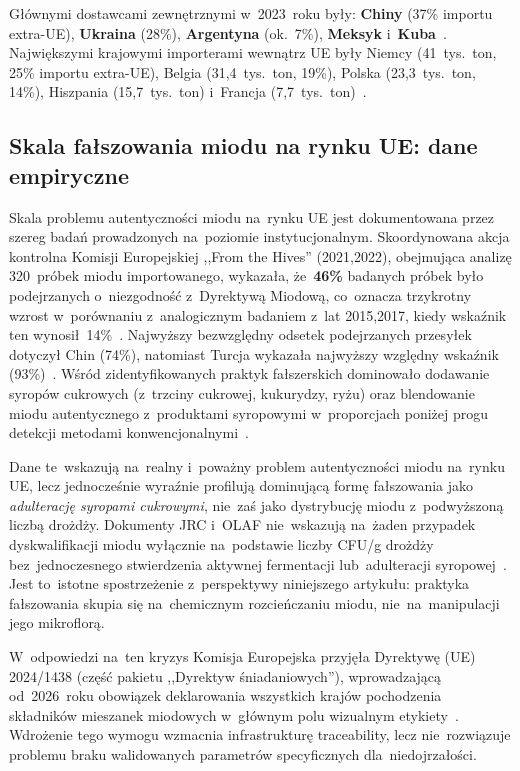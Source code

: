 Głównymi dostawcami zewnętrznymi w~2023~roku były:
\textbf{Chiny} (37\% importu extra-UE), \textbf{Ukraina} (28\%),
\textbf{Argentyna} (ok.~7\%), \textbf{Meksyk} i~\textbf{Kuba}~\cite{tridge2024}.
Największymi krajowymi importerami wewnątrz UE były Niemcy
(41~tys.~ton, 25\% importu extra-UE), Belgia (31,4~tys.~ton,
19\%), Polska (23,3~tys.~ton, 14\%), Hiszpania (15,7~tys.~ton)
i~Francja (7,7~tys.~ton)~\cite{eurostat_honey2023}. 

\subsection{Skala fałszowania miodu na rynku UE: dane empiryczne}

Skala problemu autentyczności miodu na~rynku UE jest
dokumentowana przez szereg badań prowadzonych na~poziomie
instytucjonalnym. Skoordynowana akcja kontrolna Komisji
Europejskiej ,,From the Hives'' (2021,2022), obejmująca
analizę 320~próbek miodu importowanego, wykazała, że~\textbf{46\%}
badanych próbek było podejrzanych o~niezgodność z~Dyrektywą
Miodową, co~oznacza trzykrotny wzrost w~porównaniu z~analogicznym
badaniem z~lat 2015,2017, kiedy wskaźnik ten wynosił~14\%~\cite{eufromhives2021}.
Najwyższy bezwzględny odsetek podejrzanych przesyłek
dotyczył Chin (74\%), natomiast Turcja wykazała najwyższy
względny wskaźnik (93\%)~\cite{eufromhives2021}. Wśród
zidentyfikowanych praktyk fałszerskich dominowało dodawanie
syropów cukrowych (z~trzciny cukrowej, kukurydzy, ryżu)
oraz blendowanie miodu autentycznego z~produktami
syropowymi w~proporcjach poniżej progu detekcji
metodami konwencjonalnymi~\cite{eufromhives2021,schoder2026}.

Dane te~wskazują na~realny i~poważny problem autentyczności
miodu na~rynku UE, lecz jednocześnie wyraźnie profilują
dominującą formę fałszowania jako \emph{adulterację syropami
cukrowymi}, nie~zaś jako dystrybucję miodu z~podwyższoną
liczbą drożdży. Dokumenty JRC i~OLAF nie~wskazują
na~żaden przypadek dyskwalifikacji miodu wyłącznie
na~podstawie liczby CFU/g drożdży bez~jednoczesnego
stwierdzenia aktywnej fermentacji lub~adulteracji
syropowej~\cite{eufromhives2021}. Jest to~istotne
spostrzeżenie z~perspektywy niniejszego artykułu:
praktyka fałszowania skupia się na~chemicznym rozcieńczaniu
miodu, nie~na~manipulacji jego mikroflorą.

W~odpowiedzi na~ten kryzys Komisja Europejska przyjęła
Dyrektywę (UE) 2024/1438 (część pakietu ,,Dyrektyw
śniadaniowych''), wprowadzającą od~2026~roku obowiązek
deklarowania wszystkich krajów pochodzenia składników
mieszanek miodowych w~głównym polu wizualnym
etykiety~\cite{cbi_traceability2024}. Wdrożenie tego
wymogu wzmacnia infrastrukturę traceability, lecz
nie~rozwiązuje problemu braku walidowanych parametrów
specyficznych dla~niedojrzałości.

